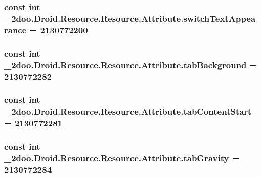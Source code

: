 \hypertarget{class__2doo_1_1_droid_1_1_resource_1_1_attribute_36e44efd880e2a1158e71eed18e178ec}{
\subsubsection[{switchTextAppearance}]{\setlength{\rightskip}{0pt plus 5cm}const int \_\-2doo.Droid.Resource.Resource.Attribute.switchTextAppearance = 2130772200}}
\label{class__2doo_1_1_droid_1_1_resource_1_1_attribute_36e44efd880e2a1158e71eed18e178ec}


\hypertarget{class__2doo_1_1_droid_1_1_resource_1_1_attribute_4ebcac62c8e86efb13d895655f3a786f}{
\subsubsection[{tabBackground}]{\setlength{\rightskip}{0pt plus 5cm}const int \_\-2doo.Droid.Resource.Resource.Attribute.tabBackground = 2130772282}}
\label{class__2doo_1_1_droid_1_1_resource_1_1_attribute_4ebcac62c8e86efb13d895655f3a786f}


\hypertarget{class__2doo_1_1_droid_1_1_resource_1_1_attribute_fcb3b52c1d3487f57e0cba997858ddcd}{
\subsubsection[{tabContentStart}]{\setlength{\rightskip}{0pt plus 5cm}const int \_\-2doo.Droid.Resource.Resource.Attribute.tabContentStart = 2130772281}}
\label{class__2doo_1_1_droid_1_1_resource_1_1_attribute_fcb3b52c1d3487f57e0cba997858ddcd}


\hypertarget{class__2doo_1_1_droid_1_1_resource_1_1_attribute_a27840b856f05a743a213329d7cb7359}{
\subsubsection[{tabGravity}]{\setlength{\rightskip}{0pt plus 5cm}const int \_\-2doo.Droid.Resource.Resource.Attribute.tabGravity = 2130772284}}
\label{class__2doo_1_1_droid_1_1_resource_1_1_attribute_a27840b856f05a743a213329d7cb7359}


